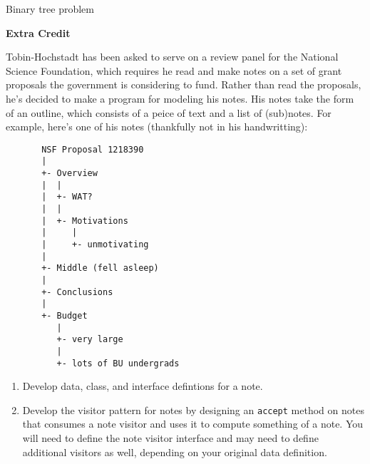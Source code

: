 \documentclass[12pt]{article}                   %
\def\pts#1{\marginpar{\footnotesize \raggedright  \fbox{#1 {\sc Points}}}}
\begin{document}
\vfill\thispagestyle{empty}
\newpage

\begin{problem} \pts{20}

 Binary tree problem

\ifrubric
\else
{}
\fi
\newpage
\newpage

\textbf{Extra Credit}

\end{problem}

\ifrubric
\else
{}
\fi
\newpage


\begin{problem} \pts{20}
\noindent
Tobin-Hochstadt has been asked to serve on a review panel for the
National Science Foundation, which requires he read and make notes on
a set of grant proposals the government is considering to fund.
Rather than read the proposals, he's decided to make a program for
modeling his notes.  His notes take the form of an outline, which
consists of a peice of text and a list of (sub)notes.  For example,
here's one of his notes (thankfully not in his handwritting):
\begin{verbatim}
       NSF Proposal 1218390
       |
       +- Overview
       |  |
       |  +- WAT?
       |  |
       |  +- Motivations
       |     |
       |     +- unmotivating
       |
       +- Middle (fell asleep)
       |
       +- Conclusions
       |
       +- Budget
          |
          +- very large
          |
          +- lots of BU undergrads
\end{verbatim}


\newpage

\begin{enumerate}

\item Develop data, class, and interface defintions for a note.

\newpage

\noindent
\item Develop the visitor pattern for notes by designing
  an \texttt{accept} method on notes that
  consumes a note visitor and uses it to compute something of a note.
  You will need to define the note visitor interface and may need to
  define additional visitors as well, depending on your original data
  definition.


\end{enumerate}
\end{problem}
\end{document}
